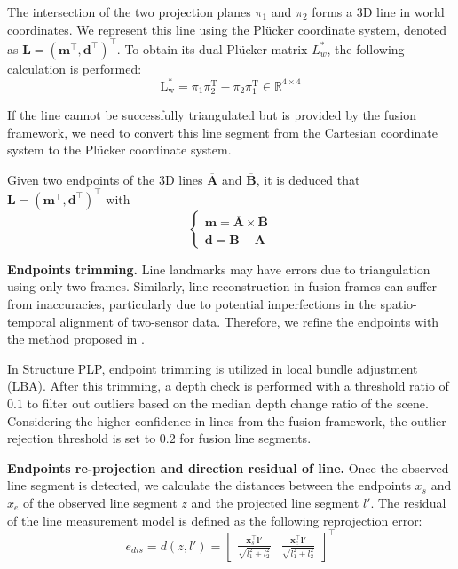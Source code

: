 The intersection of the two projection planes $\pi_1$ and $\pi_2$ forms a 3D line in world coordinates. We represent this line using the Plücker coordinate system, denoted as $\mathbf{L}=\left(\mathbf{m}^{\top}, \mathbf{d}^{\top}\right)^{\top}$. To obtain its dual Plücker matrix $L^*_w$, the following calculation is performed:
\begin{equation}
\mathrm{L^*_w}=\pi_{1}\pi_{2}^{\mathrm{T}}-\pi_{2}\pi_{1}^{\mathrm{T}}\in\mathbb{R}^{4\times4}
\end{equation}

If the line cannot be successfully triangulated but is provided by the fusion framework, we need to convert this line segment from the Cartesian coordinate system to the Plücker coordinate system. 

Given two endpoints of the 3D lines $\overline{\mathbf{A}}$  and $\overline{\mathbf{B}}$, it is deduced that $\mathbf{L}=\left(\mathbf{m}^{\top}, \mathbf{d}^{\top}\right)^{\top}$ with
\begin{equation}
\left\{\begin{array}{l}
\mathbf{m}=\overline{\mathbf{A}} \times \overline{\mathbf{B}} \\
\mathbf{d}=\overline{\mathbf{B}}-\overline{\mathbf{A}}
\end{array}\right.
\end{equation}

\noindent\textbf{Endpoints trimming.} Line landmarks may have errors due to triangulation using only two frames. Similarly, line reconstruction in fusion frames can suffer from inaccuracies, particularly due to potential imperfections in the spatio-temporal alignment of two-sensor data. Therefore, we refine the endpoints with the method proposed in \cite{lee2019elaborate, zhang2015building}. 

In Structure PLP, endpoint trimming is utilized in local bundle adjustment (LBA). After this trimming, a depth check is performed with a threshold ratio of $0.1$ to filter out outliers based on the median depth change ratio of the scene. Considering the higher confidence in lines from the fusion framework, the outlier rejection threshold is set to $0.2$ for fusion line segments. 
%

\noindent\textbf{Endpoints re-projection and direction residual of line.} Once the observed line segment is detected, we calculate the distances between the endpoints $x_s$ and $x_e$ of the observed line segment $z$ and the projected line segment $l'$. The residual of the line measurement model is defined as the following reprojection error:
\begin{equation}
e_{dis}=d(z,l')=\begin{bmatrix}
\frac{\mathbf x_s^\top \mathbf l'}{\sqrt{l_1^{2}+ l_2^{2}} }   & \frac{\mathbf x_e^\top \mathbf l'}{\sqrt{l_1^{2}+ l_2^{2}} }
\end{bmatrix}^\top
\end{equation}

